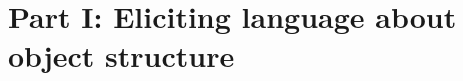 \documentclass[10pt,letterpaper]{article}
\begin{document}




\section{Part I: Eliciting language about \\ object structure} \label{sec-part-i}
\end{document}
